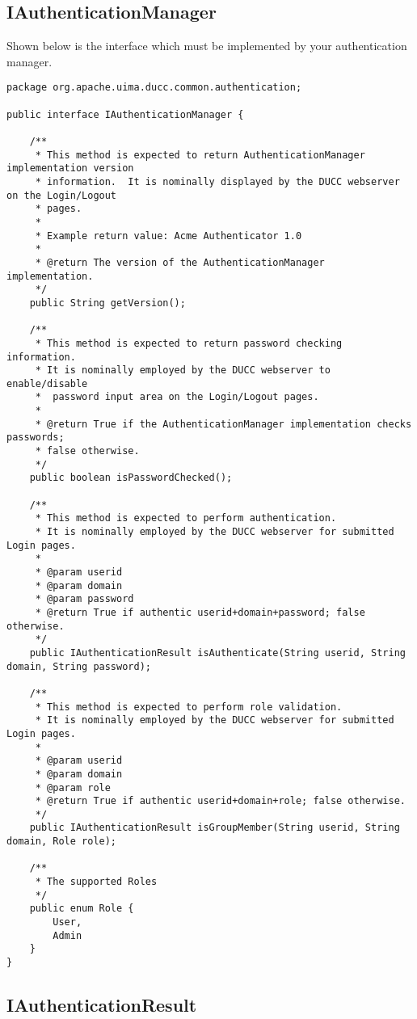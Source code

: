 \subsection{IAuthenticationManager}
       
    Shown below is the interface which must be implemented by your
    authentication manager.
    
    \begin{verbatim}
package org.apache.uima.ducc.common.authentication;

public interface IAuthenticationManager {
    
    /**
     * This method is expected to return AuthenticationManager implementation version 
     * information.  It is nominally displayed by the DUCC webserver on the Login/Logout 
     * pages.
     * 
     * Example return value: Acme Authenticator 1.0
     * 
     * @return The version of the AuthenticationManager implementation.
     */
    public String getVersion();
    
    /**
     * This method is expected to return password checking information.  
     * It is nominally employed by the DUCC webserver to enable/disable
     *  password input area on the Login/Logout pages.
     * 
     * @return True if the AuthenticationManager implementation checks passwords; 
     * false otherwise.
     */
    public boolean isPasswordChecked();
    
    /**
     * This method is expected to perform authentication.
     * It is nominally employed by the DUCC webserver for submitted Login pages.
     * 
     * @param userid
     * @param domain
     * @param password
     * @return True if authentic userid+domain+password; false otherwise.
     */
    public IAuthenticationResult isAuthenticate(String userid, String domain, String password);
    
    /**
     * This method is expected to perform role validation.
     * It is nominally employed by the DUCC webserver for submitted Login pages.
     * 
     * @param userid
     * @param domain
     * @param role
     * @return True if authentic userid+domain+role; false otherwise.
     */
    public IAuthenticationResult isGroupMember(String userid, String domain, Role role);
    
    /**
     * The supported Roles
     */
    public enum Role {
        User,
        Admin
    }
}
    \end{verbatim}


\subsection{IAuthenticationResult}
    
